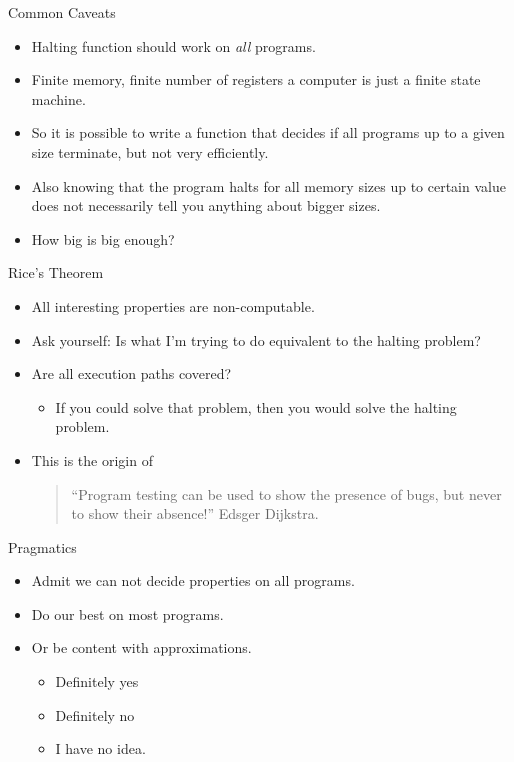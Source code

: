 \documentclass{beamer}
\begin{document}
\begin{frame}{Common Caveats}
  \begin{itemize}
  \item Halting function should work on {\em all} programs.
  \item Finite memory, finite number of registers a computer is just a
    finite state machine.
  \item So it is possible to write a function that decides if all
    programs up to a given size terminate, but not very efficiently.
  \item Also knowing that the program halts for all memory sizes up to
    certain value does not necessarily tell you anything about bigger
    sizes. 
\item How big is big enough? 
  \end{itemize}
\end{frame}
\begin{frame}{Rice's Theorem}
  \begin{itemize}
  \item All interesting properties are non-computable. 
  \item Ask yourself: Is what I'm trying to do equivalent to the
    halting problem?
    \item Are all execution paths covered?
      \begin{itemize}
      \item  If you could solve that problem, then you would solve the
        halting problem.
      \end{itemize}
    \item This is the origin of 
  \begin{quote}
    ``Program testing can be used to show the presence of bugs, but
    never to show their absence!'' Edsger Dijkstra.
  \end{quote}
  \end{itemize}
\end{frame}
\begin{frame}{Pragmatics}
  \begin{itemize}
  \item Admit we can not decide properties on all programs.
  \item Do our best on most programs.
  \item Or be content with approximations. 
    \begin{itemize}
    \item Definitely yes
    \item Definitely no
    \item I have no idea.
    \end{itemize}
  \end{itemize}
\end{frame}
\end{document}
